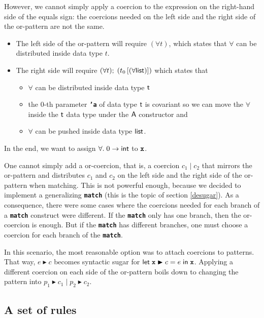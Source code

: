 \documentclass[10pt,a4paper,twoside,titlepage,twocolumn]{article}
\newcommand{\code}[1]{\textbf{\texttt{#1}}}
\begin{document}
However, we cannot simply apply a coercion to the expression on the right-hand
side of the equals sign: the coercions needed on the left side and the right
side of the or-pattern are not the same.
\begin{itemize}
  \item The left side of the or-pattern will require $(\forall t)$, which states
    that $\forall$ can be distributed inside data type $t$.
  \item The right side will require
    $(\forall t);\;(t_0\left[ (\forall \text{\textsf{list}}) \right])$
    which states
    that 
    \begin{itemize}
      \item $\forall$ can be distributed inside data type $\text{\textsf{t}}$
      \item the $0$-th parameter \code{'a} of data type $\text{\textsf{t}}$ is covariant
        so we can move the $\forall$ inside the $\text{\textsf{t}}$ data type under the
        $\text{\textsf{A}}$ constructor and 
      \item $\forall$ can be pushed inside data type $\text{\textsf{list}}$.
    \end{itemize}
\end{itemize}
In the end, we want to assign $\forall.\;0\to\text{\textsf{int}}$ to $\evid$.

One cannot simply add a or-coercion, that is, a coercion $c_1\;|\;c_2$ that
mirrors the or-pattern and distributes $c_1$ and $c_2$ on the left side and the
right side of the or-pattern when matching. This is not powerful enough, because
we decided to implement a generalizing \code{match} (this is the topic of
section \vref{desugar}). As a consequence, there were some cases where the
coercions needed for each branch of a \code{match} construct were different. If
the \code{match} only has one branch, then the or-coercion is enough. But if the
\code{match} has different branches, one must choose a coercion for each branch
of the \code{match}.

In this scenario, the most reasonable option was to attach coercions to
patterns. That way, $e \blacktriangleright c$ becomes syntactic sugar for
$\kwd{let}\; \evid \blacktriangleright c = e\;\kwd{in}\; \evid$. Applying a
different coercion on each side of the or-pattern boils down to changing the
pattern into $p_1 \blacktriangleright c_1\;|\; p_2 \blacktriangleright c_2$.

\subsection{A set of rules}
\end{document}
